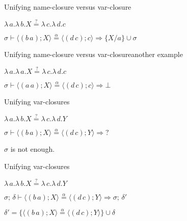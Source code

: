 \documentclass[pdf]{beamer}
\newcommand{\bd}[2] {
 #1/ #2
}
\newcommand{\clos}[2] {
\langle #2; #1 \rangle
}
\newcommand{\transition}[4] {
  $#1 \vdash #2 \stackrel{\alpha}{=} #3 \Rightarrow #4$
}
\newcommand{\eqha}[2] {
  #1\stackrel{?}{=}#2
}
\begin{document}
\begin{frame}{Unifying name-closure versus var-closure}

  {\centering
    $\eqha{\lambda\,a.\lambda\,b.X}{\lambda\,c.\lambda\,d.c}$

    \vspace{1cm}
    \transition
    {\sigma}
    {\clos{X}{(b\,a)}}
    {\clos{c}{(d\,c)}}
    {\{\bd{X}{a}\}\cup\sigma}
    \par}
\end{frame}

\begin{frame}{Unifying name-closure versus var-closure}{another example}

  {\centering
    $\eqha{\lambda\,a.\lambda\,a.X}{\lambda\,c.\lambda\,d.c}$

    \vspace{1cm}
    \transition
    {\sigma}
    {\clos{X}{(a\,a)}}
    {\clos{c}{(d\,c)}}
    \bot
    \par}
\end{frame}

\begin{frame}{Unifying var-closures}

 {\centering
     $\eqha{\lambda\,a.\lambda\,b.X}{\lambda\,c.\lambda\,d.Y}$

    \vspace{1cm}
   \transition
    {\sigma}
    {\clos{X}{(b\,a)}}
    {\clos{Y}{(d\,c)}}
    {?}
    \par}
   
  \vspace{1cm}
  {\centering
   $\sigma$ is not enough.
 \par}
\end{frame}

\begin{frame}{Unifying var-closures}

 {\centering
    $\eqha{\lambda\,a.\lambda\,b.X}{\lambda\,c.\lambda\,d.Y}$

    \vspace{1cm}
   \transition
    {\sigma;\,\delta}
    {\clos{X}{(b\,a)}}
    {\clos{Y}{(d\,c)}}
    {\sigma;\,\delta'}

    \vspace{1cm}
    $\delta' = \{\clos{X}{(b\,a)} \stackrel{\alpha}{=} \clos{Y}{(d\,c)}\}\cup\delta$
    \par}
\end{frame}
\end{document}
